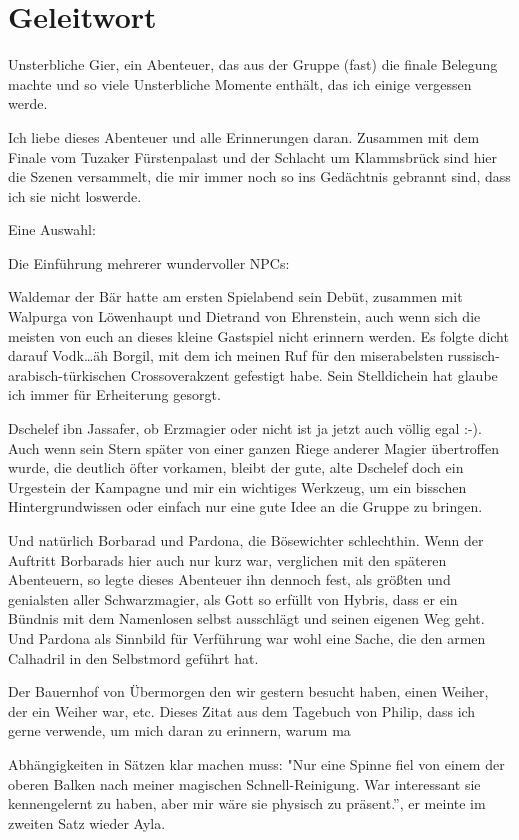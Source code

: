 \section{Geleitwort}
Unsterbliche Gier, ein Abenteuer, das aus der Gruppe (fast) die finale  Belegung machte und so viele Unsterbliche Momente enthält, das ich einige vergessen werde.\par
Ich liebe dieses Abenteuer und alle Erinnerungen daran. Zusammen mit dem Finale vom Tuzaker Fürstenpalast und der Schlacht um Klammsbrück sind hier die Szenen versammelt, die mir immer noch so ins Gedächtnis gebrannt sind, dass ich sie nicht loswerde.\par
Eine Auswahl:\par
Die Einführung mehrerer wundervoller NPCs:\par
Waldemar der Bär hatte am ersten Spielabend sein Debüt, zusammen mit Walpurga von Löwenhaupt und Dietrand von Ehrenstein, auch wenn sich die meisten von euch an dieses kleine Gastspiel nicht erinnern werden. Es folgte dicht darauf Vodk\dots äh Borgil, mit dem ich meinen Ruf für den miserabelsten russisch-arabisch-türkischen Crossoverakzent gefestigt habe. Sein Stelldichein hat glaube ich immer für Erheiterung gesorgt.\par
Dschelef ibn Jassafer, ob Erzmagier oder nicht ist ja jetzt auch völlig egal :-). Auch wenn sein Stern später von einer ganzen Riege anderer Magier übertroffen wurde, die deutlich öfter vorkamen, bleibt der gute, alte Dschelef doch ein Urgestein der Kampagne und mir ein wichtiges Werkzeug, um ein bisschen Hintergrundwissen oder einfach nur eine gute Idee an die Gruppe zu bringen.\par
Und natürlich Borbarad und Pardona, die Bösewichter schlechthin. Wenn der Auftritt Borbarads hier auch nur kurz war, verglichen mit den späteren Abenteuern, so legte dieses Abenteuer ihn dennoch fest, als größten und genialsten aller Schwarzmagier, als Gott so erfüllt von Hybris, dass er ein Bündnis mit dem Namenlosen selbst ausschlägt und seinen eigenen Weg geht. Und Pardona als Sinnbild für Verführung war wohl eine Sache, die den armen Calhadril in den Selbstmord geführt hat.\par
Der Bauernhof von Übermorgen den wir gestern besucht haben, einen Weiher, der ein Weiher war, etc.
Dieses Zitat aus dem Tagebuch von Philip, dass ich gerne verwende, um mich daran zu erinnern, warum ma\par Abhängigkeiten in Sätzen klar machen muss: "Nur eine Spinne fiel von einem der oberen Balken nach meiner magischen Schnell-Reinigung. War interessant sie kennengelernt zu haben, aber mir wäre sie physisch zu präsent.'', er meinte im zweiten Satz wieder Ayla.\par
